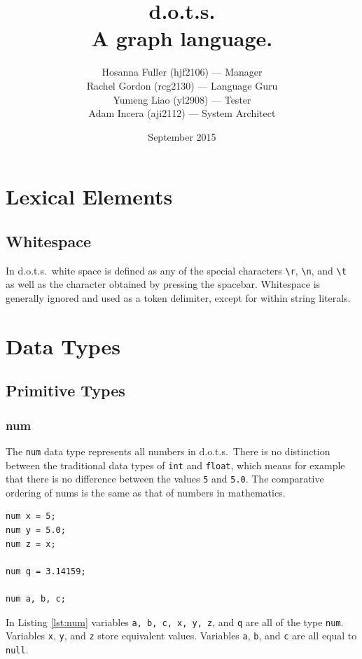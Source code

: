 \documentclass{article}
\title{d.o.t.s. \\ A graph language.}
\author{Hosanna Fuller (hjf2106) --- Manager\\
Rachel Gordon (rcg2130) --- Language Guru\\
Yumeng Liao (yl2908) --- Tester\\
Adam Incera (aji2112) --- System Architect}
\date{September 2015}
\newcommand{\pltlang}{d.o.t.s.} %
\newcommand{\code}[1]{\texttt{#1}} %
\begin{document}
\maketitle

\tableofcontents
\newpage

\section{Lexical Elements}

\subsection {Whitespace}
In \pltlang\, white space is defined as any of the special characters \code{\textbackslash r}, \code{\textbackslash n},  and \code{\textbackslash t} as well as the character obtained by pressing the spacebar. Whitespace is generally ignored and used as a token delimiter, except for within string literals.


\section{Data Types}

\subsection{Primitive Types}

\subsubsection{num}

The \code{num} data type represents all numbers in \pltlang\ There is no distinction between the traditional data types of \code{int} and \code{float}, which means for example that there is no difference between the values \code{5} and \code{5.0}. The comparative ordering of nums is the same as that of numbers in mathematics. 

\begin{lstlisting}[language=pltLang, caption=Declaration of ``num'' types., label=lst:num]
num x = 5;
num y = 5.0;
num z = x;

num q = 3.14159;

num a, b, c;
\end{lstlisting}

In Listing \ref{lst:num} variables \code{a, b, c, x, y, z}, and \code{q} are all of the type \code{num}. Variables \code{x}, \code{y}, and \code{z} store equivalent values. Variables \code{a}, \code{b}, and \code{c} are all equal to \code{null}.
\end{document}
